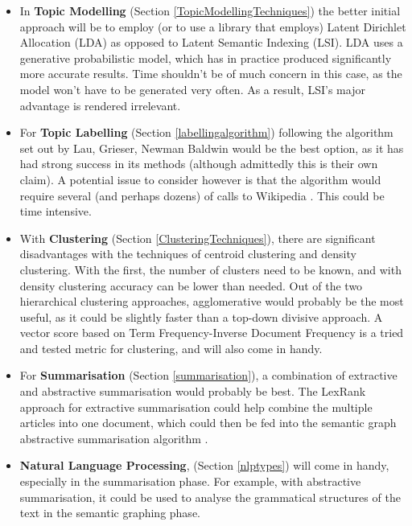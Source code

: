 \documentclass[12pt]{article}
\begin{document}
\begin{itemize}
	\item In \textbf{Topic Modelling} (Section \ref{TopicModellingTechniques}) the better initial approach will be to employ (or to use a library that employs) Latent Dirichlet Allocation (LDA) as opposed to Latent Semantic Indexing (LSI). LDA uses a generative probabilistic model, which has in practice produced significantly more accurate results. Time shouldn't be of much concern in this case, as the model won't have to be generated very often. As a result, LSI's major advantage is rendered irrelevant.
	\item For \textbf{Topic Labelling} (Section \ref{labellingalgorithm}) following the algorithm set out by Lau, Grieser, Newman Baldwin \cite{topicLabelling} would be the best option, as it has had strong success in its methods (although admittedly this is their own claim). A potential issue to consider however is that the algorithm would require several (and perhaps dozens) of calls to Wikipedia \cite{wikipedia}. This could be time intensive.
	\item With \textbf{Clustering} (Section \ref{ClusteringTechniques}), there are significant disadvantages with the techniques of centroid clustering and density clustering. With the first, the number of clusters need to be known, and with density clustering accuracy can be lower than needed. Out of the two hierarchical clustering approaches, agglomerative would probably be the most useful, as it could be slightly faster than a top-down divisive approach. A vector score based on Term Frequency-Inverse Document Frequency \cite{tfidf} is a tried and tested metric for clustering, and will also come in handy.
	\item For \textbf{Summarisation} (Section \ref{summarisation}), a combination of extractive and abstractive summarisation would probably be best. The LexRank \cite{lexRank} approach for extractive summarisation could help combine the multiple articles into one document, which could then be fed into the semantic graph abstractive summarisation algorithm \cite{abstractiveTechniques, abstractiveTechniquesOriginal}.
	\item \textbf{Natural Language Processing}, (Section \ref{nlptypes}) will come in handy, especially in the summarisation phase. For example, with abstractive summarisation, it could be used to analyse the grammatical structures of the text in the semantic graphing phase.  
\end{itemize}
\end{document}
